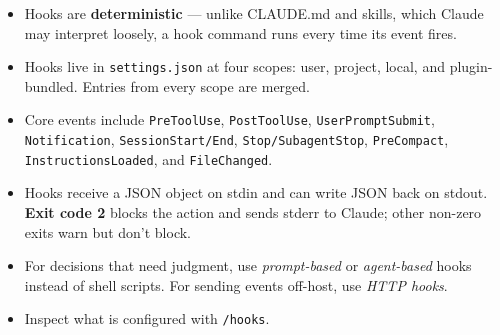 \begin{summarybox}
\begin{itemize}
  \item Hooks are \textbf{deterministic} — unlike CLAUDE.md and skills,
        which Claude may interpret loosely, a hook command runs every
        time its event fires.
  \item Hooks live in \texttt{settings.json} at four scopes: user,
        project, local, and plugin-bundled. Entries from every scope
        are merged.
  \item Core events include \texttt{PreToolUse}, \texttt{PostToolUse},
        \texttt{UserPromptSubmit}, \texttt{Notification},
        \texttt{SessionStart/End}, \texttt{Stop/SubagentStop},
        \texttt{PreCompact}, \texttt{InstructionsLoaded}, and
        \texttt{FileChanged}.
  \item Hooks receive a JSON object on stdin and can write JSON back on
        stdout. \textbf{Exit code 2} blocks the action and sends stderr
        to Claude; other non-zero exits warn but don't block.
  \item For decisions that need judgment, use \emph{prompt-based} or
        \emph{agent-based} hooks instead of shell scripts. For sending
        events off-host, use \emph{HTTP hooks}.
  \item Inspect what is configured with \texttt{/hooks}.
\end{itemize}
\end{summarybox}

\nocite{*}
\printbibliography[heading=subbibliography,title={References}]
